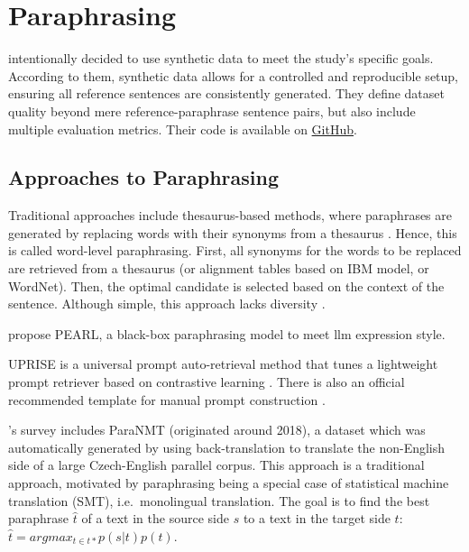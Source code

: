 \section{Paraphrasing}
\label{sec:paraphrasing}


\citet{kurt_pehlivanoglu_comparative_2024} intentionally decided to use synthetic data to meet the study's specific goals.
According to them, synthetic data allows for a controlled and reproducible setup, ensuring all reference sentences are consistently generated.
They define dataset quality beyond mere reference-paraphrase sentence pairs, but also include multiple evaluation metrics.
Their code is available on \href{https://github.com/massyakur/ParaGPT}{GitHub}.

\subsection{Approaches to Paraphrasing}

Traditional approaches include thesaurus-based methods, where paraphrases are generated by 
replacing words with their synonyms from a thesaurus \citep{zhou_paraphrase_2021}.
Hence, this is called word-level paraphrasing.
First, all synonyms for the words to be replaced are retrieved from a thesaurus 
(or alignment tables based on IBM model, or WordNet).
Then, the optimal candidate is selected based on the context of the sentence. 
Although simple, this approach lacks diversity \citep{zhou_paraphrase_2021}.

\citet{fu_learning_2024} propose PEARL, a black-box paraphrasing model to meet \ac{llm} expression style.

UPRISE is a universal prompt auto-retrieval method that tunes a lightweight prompt retriever based on contrastive learning \citep{fu_learning_2024}.
There is also an official recommended template for manual prompt construction \citep{fu_learning_2024}.

\citet{zhou_paraphrase_2021}'s survey includes ParaNMT (originated around 2018), 
a dataset which was automatically generated by using 
back-translation to translate the non-English side of a large Czech-English parallel corpus.
This approach is a traditional approach, motivated by paraphrasing being a special case of statistical machine translation (SMT), 
i.e.\ monolingual translation. 
The goal is to find the best paraphrase $\hat{t}$ of a 
text in the source side $s$ to a text in the target side $t$: 
$ \hat{t} = argmax_{t \in t*} p(s|t)p(t) $.

